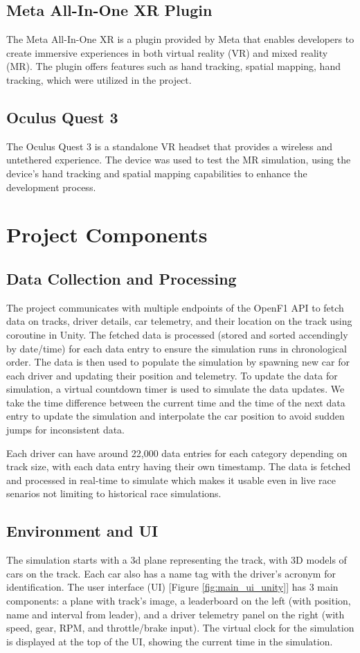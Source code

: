 \documentclass[
	a4paper, %
	10pt, %
	unnumberedsections, %
	twoside, %
]{LTJournalArticle}
\begin{document}
\subsection{Meta All-In-One XR Plugin}
The Meta All-In-One XR is a plugin provided by Meta that enables developers to create immersive experiences in both virtual reality (VR) and mixed reality (MR). The plugin offers features such as hand tracking, spatial mapping, hand tracking, which were utilized in the project.

\subsection{Oculus Quest 3}
The Oculus Quest 3 is a standalone VR headset that provides a wireless and untethered experience. The device was used to test the MR simulation, using the device's hand tracking and spatial mapping capabilities to enhance the development process.

\section{Project Components}
\subsection{Data Collection and Processing}
The project communicates with multiple endpoints of the OpenF1 API to fetch data on tracks, driver details, car telemetry, and their location on the track using coroutine in Unity. 
The fetched data is processed (stored and sorted accendingly by date/time) for each data entry to ensure the simulation runs in chronological order. The data is then used to populate the simulation by spawning new car for each driver and updating their position and telemetry.
To update the data for simulation, a virtual countdown timer is used to simulate the data updates. We take the time difference between the current time and the time of the next data entry to update the simulation and interpolate the car position to avoid sudden jumps for inconsistent data.

Each driver can have around 22,000 data entries for each category depending on track size, with each data entry having their own timestamp. The data is fetched and processed in real-time to simulate which makes it usable even in live race senarios not limiting to historical race simulations.

\subsection{Environment and UI}
The simulation starts with a 3d plane representing the track, with 3D models of cars on the track. Each car also has a name tag with the driver's acronym for identification. 
The user interface (UI) [Figure \ref{fig:main_ui_unity}] has 3 main components: a plane with track's image, a leaderboard on the left (with position, name and interval from leader), and a driver telemetry panel on the right (with speed, gear, RPM, and throttle/brake input).
The virtual clock for the simulation is displayed at the top of the UI, showing the current time in the simulation.
\end{document}
